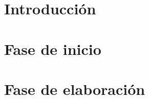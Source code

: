 \documentclass[a4paper, 10pt, twoside]{book}
\begin{document}

% 

% 

\tableofcontents 
\listoffigures

\pagestyle{fancy}

\chapter{Introducción}\label{CAPIntroduccion}


\chapter{Fase de inicio}\label{CAPInicio}


\chapter{Fase de elaboración}\label{CAPElaboracion}


% 

% 

% 


% 
\end{document}
